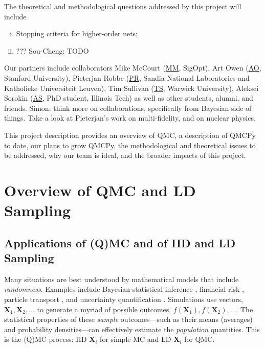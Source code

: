 \documentclass[11pt]{NSFamsart}
\newcommand{\AO}{\hyperlink{AOlink}{AO}\xspace}
\newcommand{\MM}{\hyperlink{MMlink}{MM}\xspace}
\newcommand{\TS}{\hyperlink{TSlink}{TS}\xspace}
\newcommand{\AS}{\hyperlink{ASlink}{AS}\xspace}
\newcommand{\PR}{\hyperlink{PRlink}{PR}\xspace}
\newcommand{\bX}{{\boldsymbol{X}}}
\newcommand{\SMNote}[1]{{\color{blue}Simon: #1}}
\newcommand{\SCTCNote}[1]{{\color{green}Sou-Cheng: #1}}
\begin{document}
The theoretical and methodological questions addressed by this project will include
\begin{enumerate}[i.]
\item Stopping criteria for higher-order nets;
\item ??? \SCTCNote{TODO}
\end{enumerate}

Our partners include  collaborators \hypertarget{MMlink}{Mike McCourt} (\MM, SigOpt), \hypertarget{AOlink}{Art Owen} (\AO, Stanford University), 
\hypertarget{PRlink}{Pieterjan Robbe} (\PR, Sandia National Laboratories and Katholieke Universiteit Leuven),  
\hypertarget{TSlink}{Tim Sullivan} (\TS, Warwick University), \hypertarget{ASlink}{Aleksei Sorokin } (\AS, PhD student, Illinois Tech) as well as other students, alumni, and friends. \SMNote{think more on collaborations, specifically from Bayesian side of things. Take a look at Pieterjan's work on multi-fidelity, and on nuclear physics.}

This project description  provides an overview of QMC, a description of QMCPy to date, our plans to grow QMCPy, the methodological and theoretical issues to be addressed,  why our team is ideal, and the broader impacts of this project.

\section{Overview of QMC and LD Sampling}

\subsection{Applications of (Q)MC and of IID and LD Sampling}
Many situations are best understood by mathematical models that include \emph{randomness}.  Examples include Bayesian statistical inference \cite{GelEtal13, EfrHas16}, financial risk \cite{Gla03,LEc09}, particle transport \cite{Hag14,Spa95,Vea97}, and uncertainty quantification \cite{Smi14a,HerSch20a}.  Simulations use  vectors, $\bX_1, \bX_2, \ldots$ to generate a myriad of possible outcomes, $f(\bX_1), f(\bX_2), \ldots$.  The statistical properties of these \emph{sample} outcomes---such as their means (averages) and probability densities---can effectively estimate the \emph{population} quantities.  This is the (Q)MC process:  IID $\bX_i$ for simple MC and LD $\bX_i$  for QMC.
\end{document}
